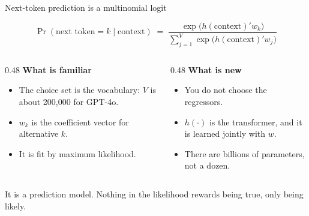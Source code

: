 \documentclass[aspectratio=169,11pt]{beamer}
\begin{document}
\begin{frame}{Next-token prediction is a multinomial logit}

\[
\Pr(\text{next token} = k \mid \text{context})
\;=\;
\frac{\exp\!\big(h(\text{context})' w_k\big)}{\sum_{j=1}^{V}\exp\!\big(h(\text{context})' w_j\big)}
\]

\vspace{0.2cm}

\begin{columns}[T]
\begin{column}{0.48\textwidth}
\textbf{What is familiar}
\begin{itemize}\setlength\itemsep{0.2em}
    \item The choice set is the vocabulary: $V$ is about 200,000 for GPT-4o.
    \item $w_k$ is the coefficient vector for alternative $k$.
    \item It is fit by maximum likelihood.
\end{itemize}
\end{column}
\begin{column}{0.48\textwidth}
\textbf{What is new}
\begin{itemize}\setlength\itemsep{0.2em}
    \item You do not choose the regressors.
    \item $h(\cdot)$ is the transformer, and it is learned jointly with $w$.
    \item There are billions of parameters, not a dozen.
\end{itemize}
\end{column}
\end{columns}

\vspace{0.35cm}

\alert{It is a prediction model. Nothing in the likelihood rewards being true, only being likely.}

\end{frame}
\end{document}
